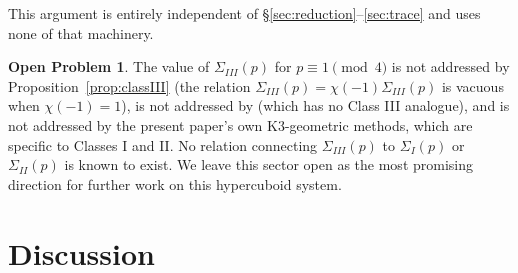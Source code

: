\documentclass[11pt]{amsart}
\theoremstyle{definition}
\newtheorem{openproblem}[theorem]{Open Problem}
\begin{document}
This argument is entirely independent of \S\ref{sec:reduction}--\ref{sec:trace} and uses none of that machinery.

\begin{openproblem}
The value of $\Sigma_{III}(p)$ for $p\equiv1\pmod4$ is not addressed by Proposition~\ref{prop:classIII} (the relation $\Sigma_{III}(p)=\chi(-1)\Sigma_{III}(p)$ is vacuous when $\chi(-1)=1$), is not addressed by \cite{AOP2002} (which has no Class III analogue), and is not addressed by the present paper's own K3-geometric methods, which are specific to Classes I and II. No relation connecting $\Sigma_{III}(p)$ to $\Sigma_I(p)$ or $\Sigma_{II}(p)$ is known to exist. We leave this sector open as the most promising direction for further work on this hypercuboid system.
\end{openproblem}

\section{Discussion}
\label{sec:discussion}
\end{document}
